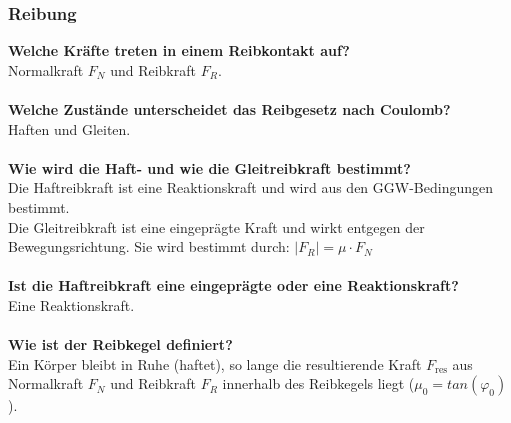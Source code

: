 \documentclass[a4paper,twocolumn,10pt]{article}
\begin{document}
\subsubsection{Reibung}
\textbf{Welche Kräfte treten in einem Reibkontakt auf?}\\
Normalkraft $F_N$ und Reibkraft $F_R$.\\\\
\textbf{Welche Zustände unterscheidet das Reibgesetz nach Coulomb?}\\
Haften und Gleiten.\\\\
\textbf{Wie wird die Haft- und wie die Gleitreibkraft bestimmt?}\\
Die Haftreibkraft ist eine Reaktionskraft und wird aus den GGW-Bedingungen bestimmt.\\
Die Gleitreibkraft ist eine eingeprägte Kraft und wirkt entgegen der Bewegungsrichtung. Sie wird bestimmt durch: $|F_R|=\mu\cdot F_N$\\\\
\textbf{Ist die Haftreibkraft eine eingeprägte oder eine Reaktionskraft?}\\
Eine Reaktionskraft.\\\\
\textbf{Wie ist der Reibkegel definiert?}\\
Ein Körper bleibt in Ruhe (haftet), so lange die resultierende Kraft $F_{\text{res}}$ aus Normalkraft $F_N$ und Reibkraft $F_R$ innerhalb des Reibkegels liegt ($\mu_0=tan(\varphi_0)$).
\end{document}
